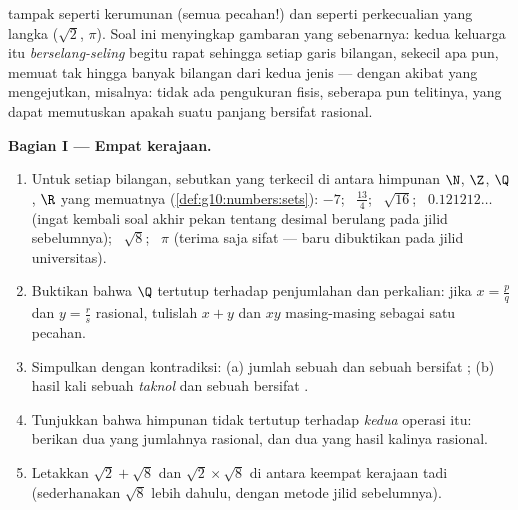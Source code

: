 \begin{problem}
\label{pb:g10:numbers:1}
 tampak seperti kerumunan (semua pecahan!) dan  seperti perkecualian yang langka ($\sqrt2$, $\pi$). Soal ini
menyingkap gambaran yang sebenarnya: kedua keluarga itu
\emph{berselang-seling} begitu rapat sehingga setiap  garis bilangan,
sekecil apa pun, memuat tak hingga banyak bilangan dari kedua jenis --- dengan
akibat yang mengejutkan, misalnya: tidak ada pengukuran fisis, seberapa pun
telitinya, yang dapat memutuskan apakah suatu panjang bersifat rasional.

\medskip
\noindent\textbf{Bagian I --- Empat kerajaan.}
\begin{enumerate}
  \item Untuk setiap bilangan, sebutkan yang terkecil di antara himpunan
        $\N$, $\Z$, $\Q$, $\R$ yang memuatnya
        (\cref{def:g10:numbers:sets}): $-7$; \ $\frac{13}{4}$; \
        $\sqrt{16}$; \ $0.121212\ldots$ (ingat kembali soal akhir pekan
        tentang desimal berulang pada jilid sebelumnya); \ $\sqrt8$; \
        $\pi$ (terima saja sifat  --- baru dibuktikan pada
        jilid universitas).
  \item Buktikan bahwa $\Q$ tertutup terhadap penjumlahan dan
        perkalian: jika $x = \frac pq$ dan $y = \frac rs$ rasional,
        tulislah $x + y$ dan $xy$ masing-masing sebagai satu pecahan.
  \item Simpulkan dengan kontradiksi: (a) jumlah sebuah  dan
        sebuah  bersifat ; (b) hasil kali sebuah
        \omterm{def:g10:numbers:sets}{bilangan rasional} \emph{taknol} dan sebuah  bersifat .
  \item Tunjukkan bahwa himpunan \omterm{ex:g10:numbers:classify}{bilangan irasional} tidak tertutup terhadap
        \emph{kedua} operasi itu: berikan dua \omterm{ex:g10:numbers:classify}{bilangan irasional} yang
        jumlahnya rasional, dan dua yang hasil kalinya rasional.
  \item Letakkan $\sqrt2 + \sqrt8$ dan $\sqrt2 \times \sqrt8$ di antara
        keempat kerajaan tadi (sederhanakan $\sqrt8$ lebih dahulu,
        dengan metode jilid sebelumnya).
\end{enumerate}


\end{problem}
